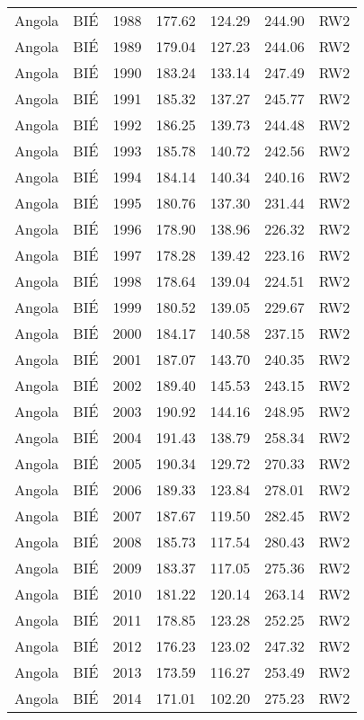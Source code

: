 \begin{longtable}{lllrrrl}
  Angola & BIÉ & 1988 & 177.62 & 124.29 & 244.90 & RW2 \\ 
  Angola & BIÉ & 1989 & 179.04 & 127.23 & 244.06 & RW2 \\ 
  Angola & BIÉ & 1990 & 183.24 & 133.14 & 247.49 & RW2 \\ 
  Angola & BIÉ & 1991 & 185.32 & 137.27 & 245.77 & RW2 \\ 
  Angola & BIÉ & 1992 & 186.25 & 139.73 & 244.48 & RW2 \\ 
  Angola & BIÉ & 1993 & 185.78 & 140.72 & 242.56 & RW2 \\ 
  Angola & BIÉ & 1994 & 184.14 & 140.34 & 240.16 & RW2 \\ 
  Angola & BIÉ & 1995 & 180.76 & 137.30 & 231.44 & RW2 \\ 
  Angola & BIÉ & 1996 & 178.90 & 138.96 & 226.32 & RW2 \\ 
  Angola & BIÉ & 1997 & 178.28 & 139.42 & 223.16 & RW2 \\ 
  Angola & BIÉ & 1998 & 178.64 & 139.04 & 224.51 & RW2 \\ 
  Angola & BIÉ & 1999 & 180.52 & 139.05 & 229.67 & RW2 \\ 
  Angola & BIÉ & 2000 & 184.17 & 140.58 & 237.15 & RW2 \\ 
  Angola & BIÉ & 2001 & 187.07 & 143.70 & 240.35 & RW2 \\ 
  Angola & BIÉ & 2002 & 189.40 & 145.53 & 243.15 & RW2 \\ 
  Angola & BIÉ & 2003 & 190.92 & 144.16 & 248.95 & RW2 \\ 
  Angola & BIÉ & 2004 & 191.43 & 138.79 & 258.34 & RW2 \\ 
  Angola & BIÉ & 2005 & 190.34 & 129.72 & 270.33 & RW2 \\ 
  Angola & BIÉ & 2006 & 189.33 & 123.84 & 278.01 & RW2 \\ 
  Angola & BIÉ & 2007 & 187.67 & 119.50 & 282.45 & RW2 \\ 
  Angola & BIÉ & 2008 & 185.73 & 117.54 & 280.43 & RW2 \\ 
  Angola & BIÉ & 2009 & 183.37 & 117.05 & 275.36 & RW2 \\ 
  Angola & BIÉ & 2010 & 181.22 & 120.14 & 263.14 & RW2 \\ 
  Angola & BIÉ & 2011 & 178.85 & 123.28 & 252.25 & RW2 \\ 
  Angola & BIÉ & 2012 & 176.23 & 123.02 & 247.32 & RW2 \\ 
  Angola & BIÉ & 2013 & 173.59 & 116.27 & 253.49 & RW2 \\ 
  Angola & BIÉ & 2014 & 171.01 & 102.20 & 275.23 & RW2 \\ 

\end{longtable}
